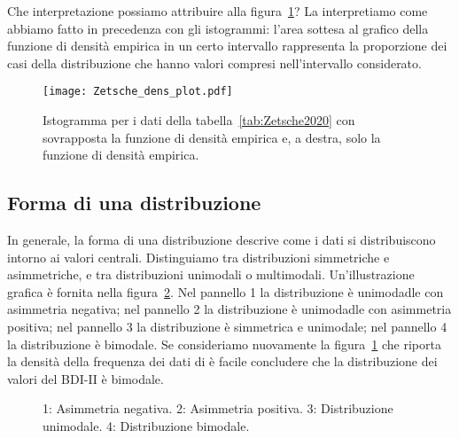 Che interpretazione possiamo attribuire alla figura~\ref{fig:Zetsche_dens_plot}? 
La interpretiamo come abbiamo fatto in precedenza con gli istogrammi: l'area sottesa al grafico della funzione di densità empirica in un certo intervallo rappresenta la proporzione dei casi della distribuzione che hanno valori compresi nell'intervallo considerato.

\begin{figure}%
 \centering
 \texttt{[image: Zetsche\_dens\_plot.pdf]}
 \caption{Istogramma per i dati della tabella~\ref{tab:Zetsche2020} con sovrapposta la funzione di densità empirica e, a destra, solo la funzione di densità empirica.}
 \label{fig:Zetsche_dens_plot}
 \end{figure}


\subsection{Forma di una distribuzione}

In generale, la forma di una distribuzione descrive come i dati si distribuiscono intorno ai valori centrali.
Distinguiamo tra distribuzioni simmetriche e asimmetriche, e tra distribuzioni unimodali o multimodali.
Un'illustrazione grafica è fornita nella figura~\ref{fig:simm_asim_bimod_distr}.
Nel pannello 1 la distribuzione è unimodadle con asimmetria negativa;
nel pannello 2 la distribuzione è unimodadle con asimmetria positiva;
nel pannello 3 la distribuzione è simmetrica e unimodale;
nel pannello 4 la distribuzione è bimodale.
Se consideriamo nuovamente la figura~\ref{fig:Zetsche_dens_plot} che riporta la densità della frequenza dei dati di \citet{zetsche_future_2019} è facile concludere che la distribuzione dei valori del BDI-II è bimodale.

\begin{figure}%
\centering
{}
\caption{1: Asimmetria negativa. 2: Asimmetria positiva. 3: Distribuzione unimodale. 4: Distribuzione bimodale.}
\label{fig:simm_asim_bimod_distr}
\end{figure}


